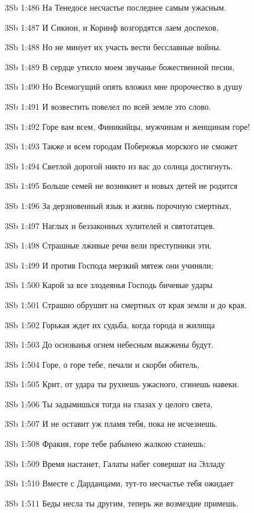 \vs 3Sb 1:486 На Тенедосе несчастье последнее самым ужасным. 

\vs 3Sb 1:487 И Сикион, и Коринф возгордятся лаем доспехов, 

\vs 3Sb 1:488 Но не минует их участь вести бесславные войны.

\vs 3Sb 1:489 В сердце утихло моем звучанье божественной песни,

\vs 3Sb 1:490 Но Всемогущий опять вложил мне пророчество в душу 

\vs 3Sb 1:491 И возвестить повелел по всей земле это слово.

\vs 3Sb 1:492 Горе вам всем, Финикийцы, мужчинам и женщинам горе! 

\vs 3Sb 1:493 Также и всем городам Побережья морского  не сможет 

\vs 3Sb 1:494 Светлой дорогой никто из вас до солнца достигнуть.

\vs 3Sb 1:495 Больше семей не возникнет и новых детей не родится  

\vs 3Sb 1:496 За дерзновенный язык и жизнь порочную смертных, 

\vs 3Sb 1:497 Наглых и беззаконных хулителей и святотатцев. 

\vs 3Sb 1:498 Страшные лживые речи вели преступники эти, 

\vs 3Sb 1:499 И против Господа мерзкий мятеж они учиняли;

\vs 3Sb 1:500 Карой за все злодеянья Господь бичевые удары

\vs 3Sb 1:501 Страшно обрушит на смертных от края земли и до края. 

\vs 3Sb 1:502 Горькая ждет их судьба, когда города и жилища 

\vs 3Sb 1:503 До основанья огнем небесным выжжены будут.

\vs 3Sb 1:504 Горе, о горе тебе, печали и скорби обитель, 

\vs 3Sb 1:505 Крит, от удара ты рухнешь ужасного, сгинешь навеки. 

\vs 3Sb 1:506 Ты задымишься тогда на глазах у целого света, 

\vs 3Sb 1:507 И не оставит уж пламя тебя, пока не исчезнешь.

\vs 3Sb 1:508 Фракия, горе тебе  рабынею жалкою станешь: 

\vs 3Sb 1:509 Время настанет, Галаты набег совершат на Элладу 

\vs 3Sb 1:510 Вместе с Дарданцами, тут-то несчастье тебя ожидает  

\vs 3Sb 1:511 Беды несла ты другим, теперь же возмездие примешь.

